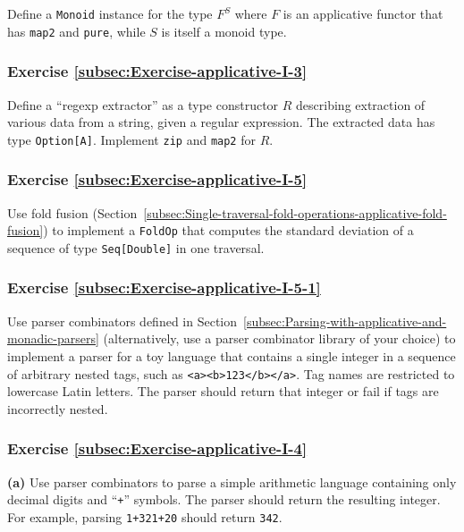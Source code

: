 Define a \lstinline!Monoid! instance for the type $F^{S}$ where
$F$ is an applicative functor that has \lstinline!map2! and \lstinline!pure!,
while $S$ is itself a monoid type.

\subsubsection{Exercise \label{subsec:Exercise-applicative-I-3}\ref{subsec:Exercise-applicative-I-3}}

Define a \textsf{``}regexp extractor\textsf{''} as a type constructor $R$ describing
extraction of various data from a string, given a regular expression.
The extracted data has type \lstinline!Option[A]!. Implement \lstinline!zip!
and \lstinline!map2! for $R$.

\subsubsection{Exercise \label{subsec:Exercise-applicative-I-5}\ref{subsec:Exercise-applicative-I-5}}

Use fold fusion (Section~\ref{subsec:Single-traversal-fold-operations-applicative-fold-fusion})
to implement a \lstinline!FoldOp! that computes the standard deviation
of a sequence of type \lstinline!Seq[Double]! in one traversal.

\subsubsection{Exercise \label{subsec:Exercise-applicative-I-5-1}\ref{subsec:Exercise-applicative-I-5-1}}

Use parser combinators defined in Section~\ref{subsec:Parsing-with-applicative-and-monadic-parsers}
(alternatively, use a parser combinator library of your choice) to
implement a parser for a toy language that contains a single integer
in a sequence of arbitrary nested tags, such as \lstinline!<a><b>123</b></a>!.
Tag names are restricted to lowercase Latin letters. The parser should
return that integer or fail if tags are incorrectly nested.

\subsubsection{Exercise \label{subsec:Exercise-applicative-I-4}\ref{subsec:Exercise-applicative-I-4}}

\textbf{(a)} Use parser combinators to parse a simple arithmetic language
containing only decimal digits and \textsf{``}\lstinline!+!\textsf{''} symbols. The
parser should return the resulting integer. For example, parsing \lstinline!1+321+20!
should return \lstinline!342!. 

